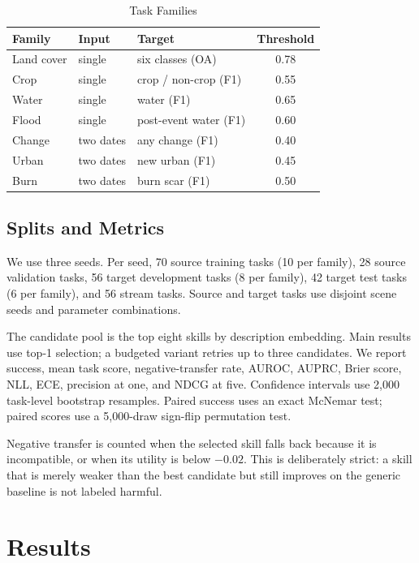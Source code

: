\documentclass[journal]{IEEEtran}
\begin{document}
\begin{table}[t]
\centering
\caption{Task Families}
\label{tab:families}
\begin{tabular}{lllc}
\toprule
Family & Input & Target & Threshold \\
\midrule
Land cover & single & six classes (OA) & 0.78 \\
Crop & single & crop / non-crop (F1) & 0.55 \\
Water & single & water (F1) & 0.65 \\
Flood & single & post-event water (F1) & 0.60 \\
Change & two dates & any change (F1) & 0.40 \\
Urban & two dates & new urban (F1) & 0.45 \\
Burn & two dates & burn scar (F1) & 0.50 \\
\bottomrule
\end{tabular}
\end{table}

\subsection{Splits and Metrics}

We use three seeds. Per seed, 70 source training tasks (10 per family), 28 source validation tasks, 56 target development tasks (8 per family), 42 target test tasks (6 per family), and 56 stream tasks. Source and target tasks use disjoint scene seeds and parameter combinations.

The candidate pool is the top eight skills by description embedding. Main results use top-1 selection; a budgeted variant retries up to three candidates. We report success, mean task score, negative-transfer rate, AUROC, AUPRC, Brier score, NLL, ECE, precision at one, and NDCG at five. Confidence intervals use 2,000 task-level bootstrap resamples. Paired success uses an exact McNemar test; paired scores use a 5,000-draw sign-flip permutation test.

Negative transfer is counted when the selected skill falls back because it is incompatible, or when its utility is below $-0.02$. This is deliberately strict: a skill that is merely weaker than the best candidate but still improves on the generic baseline is not labeled harmful.

\section{Results}
\end{document}
